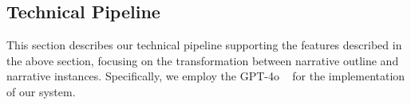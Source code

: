 






\subsection{Technical Pipeline}


\label{sec:technical_pipeline}
This section describes our technical pipeline supporting the features described in the above section, focusing on the transformation between narrative outline and narrative instances. Specifically, we employ the GPT-4o ~\cite{openai2023chatgpt} for the implementation of our system.





